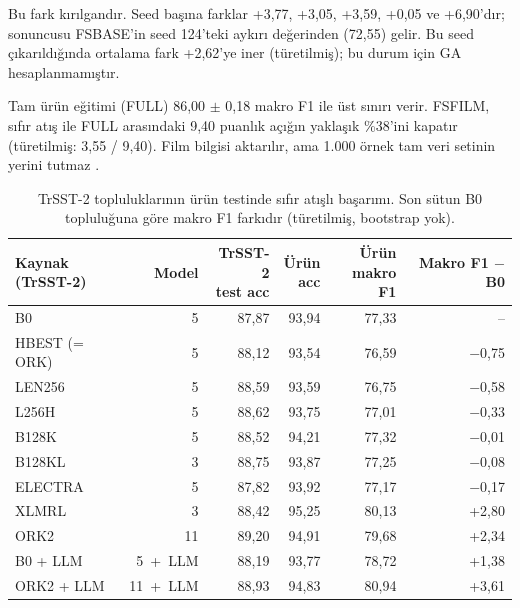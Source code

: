 \documentclass[11pt]{article}
\begin{document}
Bu fark kırılgandır. Seed başına farklar +3,77, +3,05, +3,59, +0,05 ve +6,90'dır; sonuncusu FSBASE'in seed 124'teki aykırı değerinden (72,55) gelir. Bu seed çıkarıldığında ortalama fark +2,62'ye iner (türetilmiş); bu durum için GA hesaplanmamıştır.

Tam ürün eğitimi (FULL) 86,00 $\pm$ 0,18 makro F1 ile üst sınırı verir. FSFILM, sıfır atış ile FULL arasındaki 9,40 puanlık açığın yaklaşık \%38'ini kapatır (türetilmiş: 3,55 / 9,40). Film bilgisi aktarılır, ama 1.000 örnek tam veri setinin yerini tutmaz \citep{blitzer2007,gururangan2020}.

\begin{table}[!htbp]
\centering
\small
\setlength{\tabcolsep}{4pt}
\begin{tabular}{lrrrrr}
\toprule
\makecell[l]{Kaynak \\ (TrSST-2)} & Model & \makecell[r]{TrSST-2 \\ test acc} & \makecell[r]{Ürün \\ acc} & \makecell[r]{Ürün \\ makro F1} & \makecell[r]{Makro \\ F1 $-$ B0} \\
\midrule
B0 & \mbox{5} & \mbox{87,87} & \mbox{93,94} & \mbox{77,33} & \mbox{–} \\
HBEST (= ORK) & \mbox{5} & \mbox{88,12} & \mbox{93,54} & \mbox{76,59} & \mbox{$-$0,75} \\
LEN256 & \mbox{5} & \mbox{88,59} & \mbox{93,59} & \mbox{76,75} & \mbox{$-$0,58} \\
L256H & \mbox{5} & \mbox{88,62} & \mbox{93,75} & \mbox{77,01} & \mbox{$-$0,33} \\
B128K & \mbox{5} & \mbox{88,52} & \mbox{94,21} & \mbox{77,32} & \mbox{$-$0,01} \\
B128KL & \mbox{3} & \mbox{88,75} & \mbox{93,87} & \mbox{77,25} & \mbox{$-$0,08} \\
ELECTRA & \mbox{5} & \mbox{87,82} & \mbox{93,92} & \mbox{77,17} & \mbox{$-$0,17} \\
XLMRL & \mbox{3} & \mbox{88,42} & \mbox{95,25} & \mbox{80,13} & \mbox{+2,80} \\
ORK2 & \mbox{11} & \mbox{89,20} & \mbox{94,91} & \mbox{79,68} & \mbox{+2,34} \\
B0 + LLM & \mbox{5 + LLM} & \mbox{88,19} & \mbox{93,77} & \mbox{78,72} & \mbox{+1,38} \\
ORK2 + LLM & \mbox{11 + LLM} & \mbox{88,93} & \mbox{94,83} & \mbox{80,94} & \mbox{+3,61} \\
\bottomrule
\end{tabular}
\caption{TrSST-2 topluluklarının ürün testinde sıfır atışlı başarımı. Son sütun B0 topluluğuna göre makro F1 farkıdır (türetilmiş, bootstrap yok).}
\label{tab:20}
\end{table}
\end{document}
